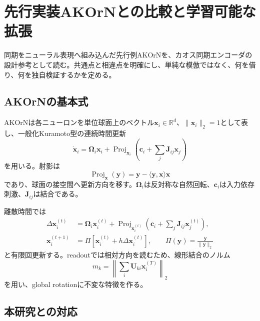 \documentclass[a4paper,11pt,oneside,openany]{ltjsbook}
\newcommand{\R}{\mathbb{R}}
\newcommand{\Proj}{\operatorname{Proj}}
\newcommand{\vect}[1]{\bm{#1}}
\newcommand{\mat}[1]{\bm{#1}}
\begin{document}
\chapter{先行実装AKOrNとの比較と学習可能な拡張}
\label{chap:akorn}

\begin{purposebox}
同期をニューラル表現へ組み込んだ先行例AKOrNを、カオス同期エンコーダの設計参考として読む。共通点と相違点を明確にし、単純な模倣ではなく、何を借り、何を独自検証するかを定める。
\end{purposebox}

\section{AKOrNの基本式}

AKOrNは各ニューロンを単位球面上のベクトル\(\vect x_i\in\R^d\)、\(\|\vect x_i\|_2=1\)として表し、一般化Kuramoto型の連続時間更新
\begin{equation}
  \dot{\vect x}_i
  =\mat\Omega_i\vect x_i
   +\Proj_{\vect x_i}\left(
      \vect c_i+\sum_j\mat J_{ij}\vect x_j
    \right)
  \label{eq:akorn_continuous}
\end{equation}
を用いる\cite{akorn}。射影は
\begin{equation}
  \Proj_{\vect x}(\vect y)
  =\vect y-\langle\vect y,\vect x\rangle\vect x
  \label{eq:akorn_projection}
\end{equation}
であり、球面の接空間へ更新方向を移す。\(\mat\Omega_i\)は反対称な自然回転、\(\vect c_i\)は入力依存刺激、\(\mat J_{ij}\)は結合である。

離散時間では
\begin{align}
  \Delta\vect x_i^{(t)}
  &=\mat\Omega_i\vect x_i^{(t)}
   +\Proj_{\vect x_i^{(t)}}\left(
     \vect c_i+\sum_j\mat J_{ij}\vect x_j^{(t)}
   \right),\\
  \vect x_i^{(t+1)}
  &=\Pi\left[\vect x_i^{(t)}+h\Delta\vect x_i^{(t)}\right],
  \qquad \Pi(\vect y)=\frac{\vect y}{\|\vect y\|_2}
  \label{eq:akorn_discrete}
\end{align}
と有限回更新する。readoutでは相対方向を読むため、線形結合のノルム
\begin{equation}
  m_k=\left\|\sum_i\mat U_{ki}\vect x_i^{(T)}\right\|_2
  \label{eq:akorn_readout}
\end{equation}
を用い、global rotationに不変な特徴を作る。

\section{本研究との対応}
\end{document}
